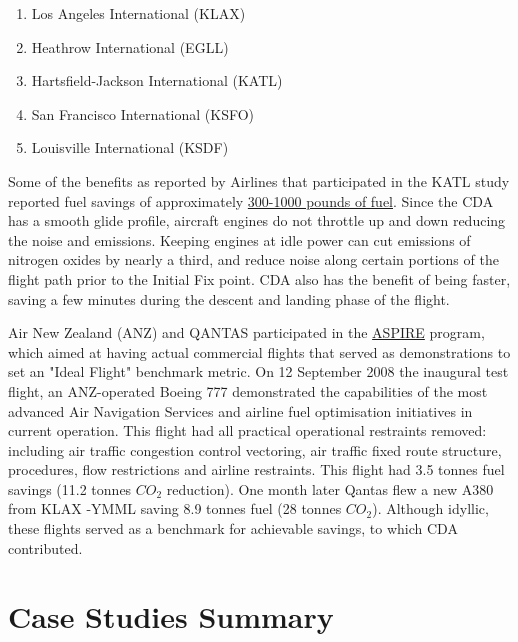 \documentclass{aer1315-pretty}
\begin{document}
\begin{enumerate}
\itemsep-0.5em
\item Los Angeles International (KLAX)
\item Heathrow International (EGLL)
\item Hartsfield-Jackson International (KATL)
\item San Francisco International (KSFO)
\item Louisville International (KSDF)
\end{enumerate}
\vspace{-2.4mm}
Some of the benefits as reported by Airlines that participated in the KATL study reported fuel savings of approximately \href{http://www.gtresearchnews.gatech.edu/continuous-descent/}{300-1000 pounds of fuel}. Since the CDA has a smooth glide profile, aircraft engines do not throttle up and down reducing the noise and emissions. Keeping engines at idle power can cut emissions of nitrogen oxides by nearly a third, and reduce noise along certain portions of the flight path prior to the Initial Fix point. CDA also has the benefit of being faster, saving a few minutes during the descent and landing phase of the flight.\par

Air New Zealand (ANZ) and QANTAS \cite{Copp:2007} participated in the \href{http://www.airways.co.nz/documents/Aspire-Annual-Report.pdf} {ASPIRE} program, which aimed at having actual commercial flights that served as demonstrations  to set an "Ideal Flight" benchmark metric. On 12 September 2008 the inaugural test flight, an ANZ-operated Boeing 777 demonstrated the capabilities of the most advanced Air Navigation Services and airline fuel optimisation initiatives in current operation. This flight had all practical operational restraints removed: including air traffic congestion control vectoring, air traffic fixed route structure, procedures, flow restrictions and airline restraints. This flight had 3.5 tonnes fuel savings (11.2 tonnes $CO_2$ reduction). One month later Qantas flew a new A380 from KLAX -YMML saving 8.9 tonnes fuel (28 tonnes $CO_2$). Although idyllic, these flights served as a benchmark for achievable savings, to which CDA contributed. \par

\section{Case Studies Summary}  \label{sec:case studies}
\end{document}
